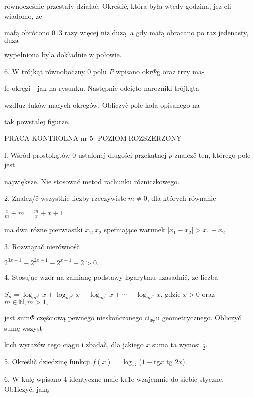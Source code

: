 \documentclass[a4paper,12pt]{article}
\begin{document}
równocześnie przestały działač. Określič, która była wtedy godzina, $\mathrm{j}\mathrm{e}\dot{\mathrm{z}}$ eli wiadomo, $\dot{\mathrm{z}}\mathrm{e}$

mafą obrócono $013$ razy więcej $\mathrm{n}\mathrm{i}\dot{\mathrm{z}}$ duzą, a gdy mafą obracano po raz jedenasty, $\mathrm{d}\mathrm{u}\dot{\mathrm{z}}\mathrm{a}$

wypełniona byla dokładnie $\mathrm{w}$ połowie.

6. $\mathrm{W}$ trójkąt równoboczny $0$ polu $P$ wpisano $\mathrm{o}\mathrm{k}\mathrm{r}\Phi \mathrm{g}$ oraz trzy ma-

fe okręgi - jak na rysunku. Następnie odcięto narozniki trójkąta

wzdłuz łuków małych okregów. Obliczyč pole koła opisanego na

tak powstalej figurze.





PRACA KONTROLNA nr 5- POZIOM ROZSZERZONY

l. Wśród prostokątów $0$ ustalonej dlugości przekątnej $p$ znalez$\acute{}$č ten, którego pole jest

największe. Nie stosowač metod rachunku rózniczkowego.

2. Znalez/č wszystkie liczby rzeczywiste $m\neq 0$, dla których równanie

$\displaystyle \frac{x}{m}+m=\frac{m}{x}+x+1$

ma dwa rózne pierwiastki $x_{1}, x_{2}$ spefniające warunek $|x_{1}-x_{2}|>x_{1}+x_{2}.$

3. Rozwiązač nierównośč

$2^{3x-1}-2^{2x-1}-2^{x+1}+2>0.$

4. Stosując wzór na zamianę podstawy logarytmu uzasadnič, $\dot{\mathrm{z}}\mathrm{e}$ liczba

$S_{n}=\log_{m^{2^{0}}}x+\log_{m^{2^{1}}}x+\log_{m^{2^{2}}}x+\cdots+\log_{m^{2^{n}}}x$, gdzie $x>0$ oraz $m\in \mathbb{N}, m>1,$

jest $\mathrm{s}\mathrm{u}\mathrm{m}\Phi$ częściową pewnego nieskończonego $\mathrm{c}\mathrm{i}_{\Phi \mathrm{g}}\mathrm{u}$ geometrycznego. Obliczyč sumę wszyst-

kich wyrazów tego ciągu $\mathrm{i}$ zbadač, dla jakiego $x$ suma ta wynosi $\displaystyle \frac{1}{2}.$

5. Określič dziedzinę funkcji $f(x)=\log_{x^{2}}$($1-\mathrm{t}\mathrm{g}x$ tg $2x$).

6. $\mathrm{W}$ kulę wpisano 4 identyczne mafe ku1e wzajemnie do siebie styczne. Ob1iczyč, jaką
\end{document}
